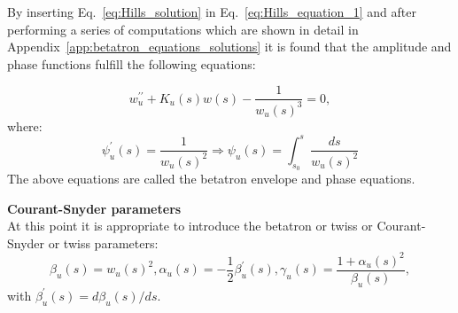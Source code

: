 By inserting Eq.~\eqref{eq:Hills_solution} in Eq.~\eqref{eq:Hills_equation_1} and after performing a series of computations which are shown in detail in Appendix~\ref{app:betatron_equations_solutions} it is found that the amplitude and phase functions fulfill the following equations: 

\begin{equation}\label{eq:phase_functions}
    w^{\prime \prime}_u + K_u(s) w(s) -\frac{1}{w_u(s)^3} = 0, 
\end{equation}
where:
\begin{equation}\label{eq:phase_function}
    \psi^{\prime}_u(s) = \frac{1}{w_u(s)^2} \Rightarrow \psi_u(s) = \int_{s_0}^{s} \frac{ds}{w_u(s)^2}
\end{equation}
The above equations are called the betatron envelope and phase equations.

\textbf{Courant-Snyder parameters}\\
At this point it is appropriate to introduce the betatron or twiss or Courant-Snyder or twiss parameters:%
\begin{subequations}\label{eq:twiss_func}
    \begin{equation}
        \beta_u(s) = w_u(s)^2,
    \end{equation}    
    \begin{equation}
       \alpha_u(s) = -\frac{1}{2} \beta^{\prime}_u(s),
    \end{equation} 
    \begin{equation}
       \gamma_u(s) = \frac{1+\alpha_u(s)^2}{\beta_u(s)},
    \end{equation}
\end{subequations}
with $\beta^{\prime}_u(s) = d\beta_u(s)/ds$.




